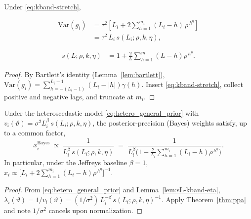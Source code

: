 \begin{lemma}\label{lem:sL-kband-eta}
Under \eqref{eq:kband-stretch},

\begin{align}
\mathrm{Var}(g_i)
&= \tau^2\!\left[
  L_i + 2\sum_{h=1}^{m_i} (L_i-h)\,\rho^{\,h^{\eta}}
\right] \\
&= \tau^2\,L_i\,s(L_i;\rho,k,\eta),
\label{eq:v-and-s-kband-eta}
\end{align}

\begin{align}
s(L;\rho,k,\eta)
&= 1+\frac{2}{L}\sum_{h=1}^{m} (L-h)\rho^{\,h^{\eta}}.
\end{align}
\end{lemma}

\begin{proof}
By Bartlett’s identity (Lemma~\ref{lem:bartlett}),
$\mathrm{Var}(g_i)=\sum_{h=-(L_i-1)}^{L_i-1}(L_i-|h|)\gamma(h)$.
Insert \eqref{eq:kband-stretch}, collect positive and negative lags, and truncate at $m_i$.
\end{proof}

\begin{proposition}\label{prop:weights-kband-eta}
Under the heteroscedastic model \eqref{eq:hetero_general_prior} with
\(
v_i(\vartheta)=\sigma^2 L_i^{\beta}\,s(L_i;\rho,k,\eta)
\),
the posterior-precision (Bayes) weights satisfy, up to a common factor,
\begin{equation}
x_i^{\mathrm{Bayes}} \ \propto\ \frac{1}{L_i^{\beta}\,s(L_i;\rho,k,\eta)}
\;=\;
\frac{1}{L_i^{\beta}\Big(1+\frac{2}{L_i}\sum_{h=1}^{m_i}(L_i-h)\rho^{\,h^{\eta}}\Big)}.
\label{eq:weights-kband-eta}
\end{equation}
In particular, under the Jeffreys baseline $\beta=1$,
\(
x_i \propto \big[L_i + 2\sum_{h=1}^{m_i}(L_i-h)\rho^{\,h^{\eta}}\big]^{-1}.
\)
\end{proposition}

\begin{proof}
From \eqref{eq:hetero_general_prior} and Lemma~\ref{lem:sL-kband-eta},
\(
\lambda_i(\vartheta)=1/v_i(\vartheta)=(1/\sigma^2)\,L_i^{-\beta}\,s(L_i;\rho,k,\eta)^{-1}
\).
Apply Theorem~\ref{thm:ppa} and note $1/\sigma^2$ cancels upon normalization.
\end{proof}

